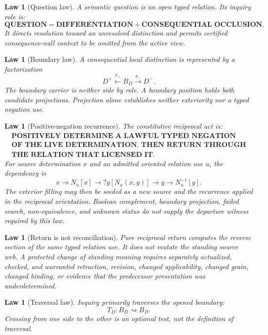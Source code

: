 \documentclass[11pt,oneside]{article}
\newtheorem{law}[definition]{Law}
\begin{document}
\begin{law}[Question law]
A semantic question is an open typed relation.  Its inquiry role is:
\[
\boxed{
\textbf{QUESTION}
=
\textbf{DIFFERENTIATION}
+
\textbf{CONSEQUENTIAL OCCLUSION}.
}
\]
It directs resolution toward an unresolved distinction and permits certified consequence-null context to be omitted from the active view.
\end{law}

\begin{law}[Boundary law]
A consequential local distinction is represented by a factorization
\[
\boxed{
D^+ \xleftarrow{\pi_+} B_D \xrightarrow{\pi_-} D^- .
}
\]
The boundary carrier is neither side by role.  A boundary position holds both candidate projections.  Projection alone establishes neither exteriority nor a typed negation use.
\end{law}

\begin{law}[Positive-negation recurrence]\label{law:positive-negation-recurrence}
The constitutive reciprocal act is:
\[
\boxed{
\begin{gathered}
\textbf{POSITIVELY DETERMINE A LAWFUL TYPED NEGATION}\\
\textbf{OF THE LIVE DETERMINATION, THEN RETURN THROUGH}\\
\textbf{THE RELATION THAT LICENSED IT.}
\end{gathered}
}
\]
For source determination \(x\) and an admitted oriented relation use \(u\), the dependency is
\[
x\longrightarrow N_u[x]
\longrightarrow ?y[N_u(x,y)]
\longrightarrow y
\longrightarrow N_u^{-1}[y].
\]
The exterior filling may then be seeded as a new source and the recurrence applied in the reciprocal orientation.  Boolean complement, boundary projection, failed search, non-equivalence, and unknown status do not supply the departure witness required by this law.
\end{law}

\begin{law}[Return is not reconciliation]\label{law:return-not-reconciliation}
Pure reciprocal return computes the reverse section of the same typed relation use.  It does not mutate the standing source web.  A protected change of standing meaning requires separately actualized, checked, and warranted retraction, revision, changed applicability, changed grain, changed binding, or evidence that the predecessor presentation was underdetermined.
\end{law}

\begin{law}[Traversal law]
Inquiry primarily traverses the opened boundary:
\[
\boxed{T_D:B_D\rightsquigarrow B_D.}
\]
Crossing from one side to the other is an optional test, not the definition of traversal.
\end{law}
\end{document}
